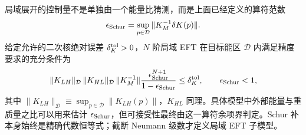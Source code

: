 \begin{derivation}
局域展开的控制量不是单独由一个能量比猜测，而是上面已经定义的算符范数
\begin{equation*}
 \epsilon_{\rm Schur}=\sup_{p\in\mathcal D}\|K_M^{-1}\delta K(p)\|.
\end{equation*}
给定允许的二次核绝对误差 $\delta_K^{\rm tol}>0$，$N$ 阶局域 EFT 在目标能区 $\mathcal D$ 内满足精度要求的充分条件为
\begin{equation*}
 \|K_{LH}\|_{\mathcal D}\,\|K_{HL}\|_{\mathcal D}\,
 \|K_M^{-1}\|
 \frac{\epsilon_{\rm Schur}^{N+1}}{1-\epsilon_{\rm Schur}}
 \le \delta_K^{\rm tol},
 \qquad \epsilon_{\rm Schur}<1,
\end{equation*}
其中 $\|K_{LH}\|_{\mathcal D}\equiv\sup_{p\in\mathcal D}\|K_{LH}(p)\|$，$K_{HL}$ 同理。具体模型中外部能量与重质量之比可以用来估计 $\epsilon_{\rm Schur}$，但可接受性最终由这一算符余项界判定。Schur 补本身始终是精确代数恒等式；截断 Neumann 级数才定义局域 EFT 子模型。
\end{derivation}
